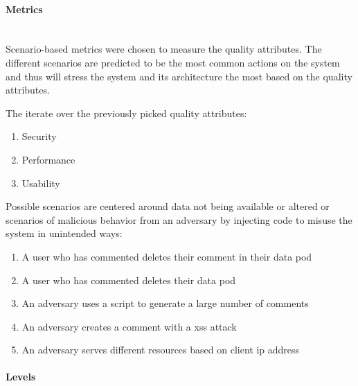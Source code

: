 \paragraph{Metrics}\mbox{}\\

Scenario-based metrics were chosen to measure the quality attributes. The different scenarios are predicted to be the most common actions on the system and thus will stress the system and its architecture the most based on the quality attributes.

The iterate over the previously picked quality attributes:


\begin{enumerate}
    \item Security
    \item Performance
    \item Usability
\end{enumerate}


Possible scenarios are centered around data not being available or altered or scenarios of malicious behavior from an adversary by injecting code to misuse the system in unintended ways:


\begin{enumerate}
    \item A user who has commented deletes their comment in their data pod
    \item A user who has commented deletes their data pod
    \item An adversary uses a script to generate a large number of comments
    \item An adversary creates a comment with a \gls{xss} attack
    \item An adversary serves different resources based on client \gls{ip} address
\end{enumerate}

\vspace{0.5cm}
\paragraph{Levels}\mbox{}\\

